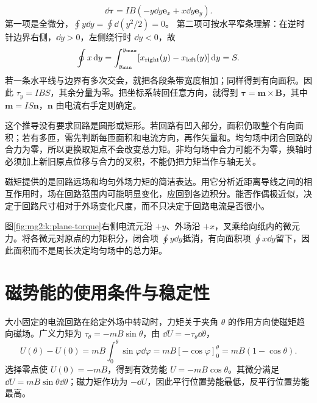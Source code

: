 \[
\dd\bm\tau=IB(-y\dd y\bm e_x+x\dd y\bm e_y).
\]
第一项是全微分，$\oint y\dd y=\oint\dd(y^2/2)=0$。
第二项可按水平窄条理解：在逆时针边界右侧，$\dd y>0$，左侧绕行时 $\dd y<0$，故
\[
 \oint x\mathop{}\!\mathrm d y=\int_{y_{\min}}^{y_{\max}}
 [x_{\rm right}(y)-x_{\rm left}(y)]\mathop{}\!\mathrm d y=S.
\]
若一条水平线与边界有多次交会，就把各段条带宽度相加；同样得到有向面积。因此 $\tau_y=IBS$，其余分量为零。把坐标系转回任意方向，就得到 $\bm\tau=\bm m\times\bm B$，其中 $\bm m=IS\bm n$，$\bm n$ 由电流右手定则确定。


这个推导没有要求回路是圆形或矩形。若回路有凹入部分，面积仍取整个有向面积；若有多匝，需先判断每匝面积和电流方向，再作矢量和。均匀场中闭合回路的合力为零，所以更换取矩点不会改变总力矩。非均匀场中合力可能不为零，换轴时必须加上新旧原点位移与合力的叉积，不能仍把力矩当作与轴无关。


磁矩提供的是回路远场和均匀外场力矩的简洁表达。用它分析近距离导线之间的相互作用时，场在回路范围内可能明显变化，应回到各边积分。能否作偶极近似，决定于回路尺寸相对于外场变化尺度，而不只决定于回路电流是否很小。


图\ref{fig:mg2:k:plane-torque}右侧电流元沿 $+y$、外场沿 $+x$，叉乘给向纸内的微元力。将各微元对原点的力矩积分，闭合项 $\oint y\dd y$抵消，有向面积项 $\oint x\dd y$留下，因此面积而不是周长决定均匀场中的总力矩。


\section{磁势能的使用条件与稳定性}
大小固定的电流回路在给定外场中转动时，力矩关于夹角 $\theta$ 的作用方向使磁矩趋向磁场。广义力矩为 $\tau_\theta=-mB\sin\theta$，由 $\dd U=-\tau_\theta\dd\theta$，
\[
 U(\theta)-U(0)=mB\int_0^\theta\sin\varphi\dd\varphi
 =mB[-\cos\varphi]_0^\theta=mB(1-\cos\theta).
\]
选择零点使 $U(0)=-mB$，得到有效势能 $U=-mB\cos\theta$。其微分满足 $\dd U=mB\sin\theta\dd\theta$；磁力矩作功为 $-\dd U$，因此平行位置势能最低，反平行位置势能最高。


